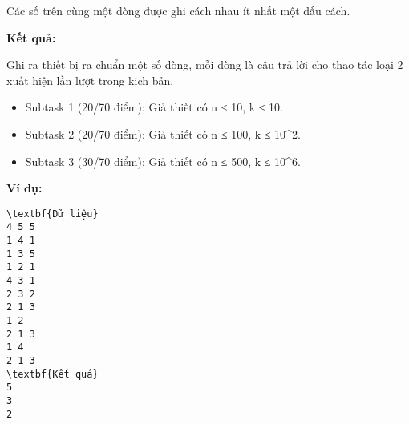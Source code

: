 Các số trên cùng một dòng được ghi cách nhau ít nhất một dấu cách.

\textbf{Kết quả:}

Ghi ra thiết bị ra chuẩn một số dòng, mỗi dòng là câu trả lời cho thao tác loại 2 xuất hiện lần lượt trong kịch bản.
\begin{itemize}
	\item Subtask 1 (20/70 điểm): Giả thiết có n ≤ 10, k ≤ 10.
	\item Subtask 2 (20/70 điểm): Giả thiết có n ≤ 100, k ≤ 10\textasciicircum2.
	\item Subtask 3 (30/70 điểm): Giả thiết có n ≤ 500, k ≤ 10\textasciicircum6.
\end{itemize}

\textbf{Ví dụ:}
\begin{verbatim}
\textbf{Dữ liệu}
4 5 5
1 4 1
1 3 5
1 2 1
4 3 1
2 3 2
2 1 3
1 2
2 1 3
1 4
2 1 3
\textbf{Kết quả}
5
3
2

\end{verbatim}